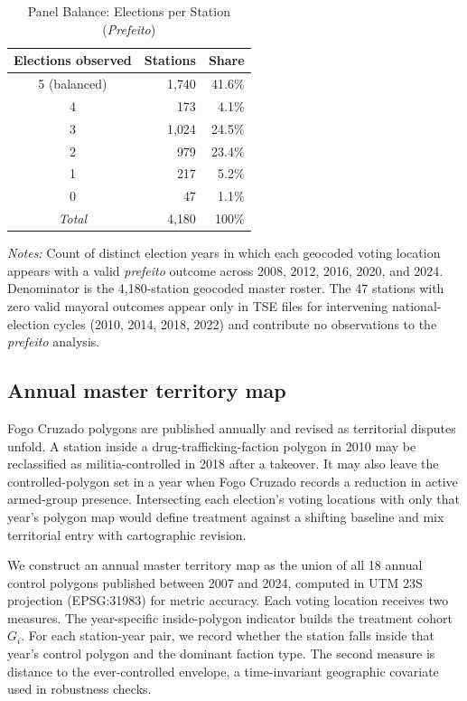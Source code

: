 \documentclass[11pt]{article}
\newcommand{\tabnotes}[1]{\par\vspace{3pt}\noindent\begin{minipage}{\linewidth}\footnotesize #1\end{minipage}}
\begin{document}
\begin{table}[H]
\centering
\caption{Panel Balance: Elections per Station (\emph{Prefeito})}\label{tab:panel_balance}
\footnotesize
\begin{tabular}{@{}c r r@{}}
\toprule
Elections observed & Stations & Share \\
\midrule
5 (balanced)  & 1{,}740 & 41.6\% \\
4             &   173 & 4.1\% \\
3             & 1{,}024 & 24.5\% \\
2             &   979 & 23.4\% \\
1             &   217 & 5.2\% \\
0             &    47 & 1.1\% \\
\midrule
\textit{Total}  & 4{,}180\phantom{0} & 100\%\phantom{0} \\
\bottomrule
\end{tabular}
\tabnotes{\textit{Notes:} Count of distinct election years in which each geocoded voting location appears with a valid \emph{prefeito} outcome across 2008, 2012, 2016, 2020, and 2024. Denominator is the 4,180-station geocoded master roster. The 47 stations with zero valid mayoral outcomes appear only in TSE files for intervening national-election cycles (2010, 2014, 2018, 2022) and contribute no observations to the \emph{prefeito} analysis.}
\end{table}

\subsection{Annual master territory map}

Fogo Cruzado polygons are published annually and revised as territorial disputes unfold. A station inside a drug-trafficking-faction polygon in 2010 may be reclassified as militia-controlled in 2018 after a takeover. It may also leave the controlled-polygon set in a year when Fogo Cruzado records a reduction in active armed-group presence. Intersecting each election's voting locations with only that year's polygon map would define treatment against a shifting baseline and mix territorial entry with cartographic revision.

We construct an annual master territory map as the union of all 18 annual control polygons published between 2007 and 2024, computed in UTM 23S projection (EPSG:31983) for metric accuracy. Each voting location receives two measures. The year-specific inside-polygon indicator builds the treatment cohort $G_i$. For each station-year pair, we record whether the station falls inside that year's control polygon and the dominant faction type. The second measure is distance to the ever-controlled envelope, a time-invariant geographic covariate used in robustness checks.
\end{document}
